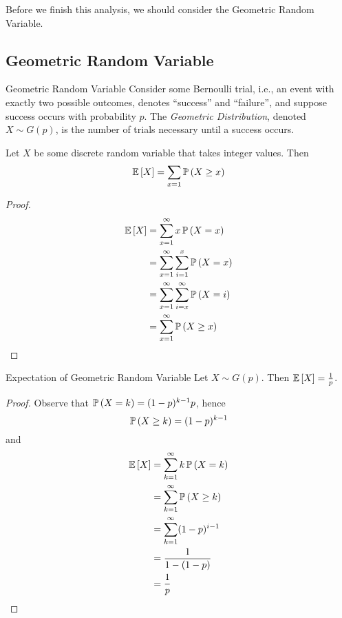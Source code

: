 Before we finish this analysis, we should consider the Geometric Random
Variable.

\subsection{Geometric Random Variable}
\begin{definition}{Geometric Random Variable}{}
    Consider some Bernoulli trial, i.e., an event with exactly two possible
    outcomes, denotes ``success'' and ``failure'', and suppose success occurs
    with probability $p$. The \emph{Geometric Distribution}, denoted $X \sim
    G(p)$, is the number of trials necessary until a success occurs. 
\end{definition}

\begin{lemma}{}{}
    Let $X$ be some discrete random variable that takes integer values. Then
    \[\operatorname{\mathbb{E}}\left[X\right] = \sum_{x = 1} \operatorname{\mathbb{P}}\left(X \geq x\right)\]
\end{lemma}

\begin{proof}
    \begin{align*}\operatorname{\mathbb{E}}\left[X\right]
        &= \sum_{x=1}^{\infty}x \operatorname{\mathbb{P}}\left(X=x\right)\\
        &= \sum_{x=1}^{\infty}\sum_{i=1}^x \operatorname{\mathbb{P}}\left(X=x\right)\\
        &= \sum_{x=1}^{\infty}\sum_{i=x}^{\infty}\operatorname{\mathbb{P}}\left(X=i\right)\\
        &= \sum_{x=1}^{\infty}\operatorname{\mathbb{P}}\left(X \geq x\right)
    \end{align*}
\end{proof}

\begin{theorem}{Expectation of Geometric Random Variable}{}
    Let $X \sim G(p)$. Then $\operatorname{\mathbb{E}}\left[X\right] = \frac{1}{p}$.
\end{theorem}

\begin{proof}
    Observe that $\operatorname{\mathbb{P}}\left(X = k\right) = (1 - p)^{k - 1}p$, hence
    \[\operatorname{\mathbb{P}}\left(X \geq k\right) = (1 - p)^{k - 1}\]
    and
    \begin{align*}\operatorname{\mathbb{E}}\left[X\right]
        &= \sum_{k=1}^{\infty} k\operatorname{\mathbb{P}}\left(X = k\right)\\
        &= \sum_{k=1}^{\infty} \operatorname{\mathbb{P}}\left(X \geq k\right)\\
        &= \sum_{k=1}^{\infty} (1 - p)^{i - 1}\\
        &= \frac{1}{1 - (1 - p)}\\
        &= \frac{1}{p}
    \end{align*}
\end{proof}

